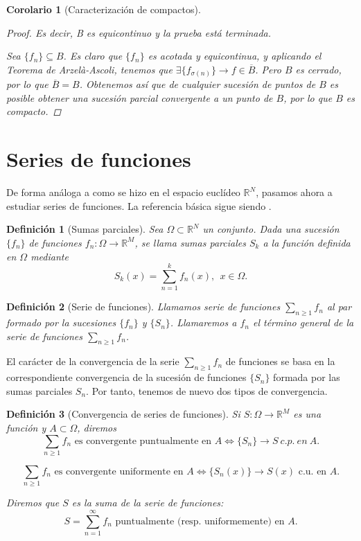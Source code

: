 \documentclass[11pt, a4paper]{article}
\newcommand{\fn}{\{f_n\}}
\theoremstyle{theorem-style}
\newtheorem{ncor}{Corolario}[section]
\theoremstyle{definition-style}
\newtheorem{ndef}{Definición}[section]
\theoremstyle{remark-style}
\theoremstyle{example-style}
\begin{document}
\begin{ncor}[Caracterización de compactos]
\begin{proof}
Es decir, B es equicontinuo y la prueba está terminada.

    \boxed{\Leftarrow} Sea $\fn \subseteq B$. Es claro que $\fn$ es acotada y equicontinua, y aplicando el \textit{Teorema de Arzelà-Ascoli}, tenemos que $\exists \{f_{\sigma(n)}\} \to f \in \overline{B}$. Pero $B$ es cerrado, por lo que $\overline{B} = B$. Obtenemos así que de cualquier sucesión de puntos de $B$ es posible obtener una sucesión parcial convergente a un punto de $B$, por lo que $B$ es compacto.
\end{proof}
	
\end{ncor}

\newpage



\section{Series de funciones}

De forma análoga a como se hizo en el espacio euclídeo $\mathbb{R}^N$, pasamos ahora a estudiar series de funciones. La referencia básica sigue siendo \cite[Capítulo 5]{marsden}.

\begin{ndef}[Sumas parciales]
Sea $\Omega\subset \mathbb R^N$ un conjunto. 
Dada una sucesi\'on $\{f_n \}$ de funciones $f_n : \Omega \longrightarrow \mathbb R^M$, se llama sumas parciales $S_k$ a la funci\'on definida en $\Omega$ mediante
 \[ 
 S_k (x) = \sum_{n=1}^{k} f_n(x),\ \ x\in\Omega.
 \] 
\end{ndef}

\begin{ndef}[Serie de funciones]
Llamamos serie  de funciones $\sum_{n\geq 1} f_n$ al par formado por la sucesiones  $\{ f_n \}$ y $\{S_n\}$. Llamaremos a $f_n$ el t\'ermino general de la serie de funciones $\displaystyle\sum_{n\geq 1} f_n$.
\end{ndef}


El car\'acter de la convergencia de la serie $\sum_{n\geq 1} f_n$ de funciones se basa en la correspondiente convergencia de la sucesi\'on de funciones $\{S_n\}$ formada por las sumas parciales $S_n$. Por tanto, tenemos de nuevo dos tipos de convergencia.
\begin{ndef}[Convergencia de series de funciones]
Si $S:\Omega\longrightarrow \mathbb R^M$ es una funci\'on y $A\subset \Omega$, diremos 
$$\sum_{n\geq 1} f_n  \mbox{ es convergente puntualmente en } A \Leftrightarrow \{S_n \} \longrightarrow S\ c.p.\ en\ A.$$

$$\sum_{n\geq 1} f_n  \mbox{ es convergente uniformente en }A \Leftrightarrow \{S_n(x)\} \longrightarrow S(x) \mbox{ c.u. en }A.$$ 

Diremos que $S$ es la suma de la serie de funciones: 
\[
S=\displaystyle \sum_{n=1}^{\infty} f_n \mbox{ puntualmente (resp. uniformemente) en $A$.}
\]
\end{ndef}
\end{document}
